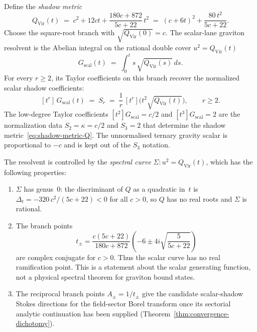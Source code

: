\begin{theorem}
\label{thm:graviton-resolvent-closed}%
%
%
Define the \emph{shadow metric}
\begin{equation}\label{eq:shadow-metric-Q}
Q_{\mathrm{Vir}}(t)
\;=\;
c^2 + 12ct + \frac{180c + 872}{5c + 22}\,t^2
\;=\;
(c + 6t)^2 + \frac{80\,t^2}{5c + 22}.
\end{equation}
Choose the square-root branch with
\(\sqrt{Q_{\mathrm{Vir}}(0)}=c\). The scalar-lane graviton
resolvent is the Abelian integral on the rational double cover
\(u^2=Q_{\mathrm{Vir}}(t)\)
\begin{equation}\label{eq:graviton-resolvent-closed}
G_{\mathrm{scal}}(t)
\;=\;
\int_0^t s\,\sqrt{Q_{\mathrm{Vir}}(s)}\,ds.
\end{equation}
For every \(r\ge2\), its Taylor coefficients on this branch recover
the normalized scalar shadow coefficients:
\begin{equation}\label{eq:resolvent-shadow-extraction}
[t^r]\,G_{\mathrm{scal}}(t)
\;=\;
S_r
\;=\;
\frac{1}{r}\,[t^r]\bigl(t^2\sqrt{Q_{\mathrm{Vir}}(t)}\bigr),
\qquad r \ge 2.
\end{equation}
The low-degree Taylor coefficients
$[t^2]G_{\mathrm{scal}} = c/2$ and
$[t^3]G_{\mathrm{scal}} = 2$ are the normalization data
$S_2 = \kappa = c/2$ and $S_3=2$ that determine
the shadow metric~\eqref{eq:shadow-metric-Q}. The unnormalised ternary
gravity scalar is proportional to $-c$ and is kept out of the $S_3$
notation.

The resolvent is controlled by the \emph{spectral curve}
$\Sigma \colon u^2 = Q_{\mathrm{Vir}}(t)$, which has the
following properties:
\begin{enumerate}[label=\textup{(\roman*)}]
\item $\Sigma$ has genus~$0$: the discriminant of $Q$ as a
 quadratic in~$t$ is
 $\Delta_t = -320\,c^2/(5c+22) < 0$ for all $c > 0$,
 so $Q$ has no real roots and $\Sigma$ is rational.
\item The branch points
 \[
 t_\pm =
 \frac{c(5c+22)}{180c+872}
 \left(-6 \pm 4i\sqrt{\frac{5}{5c+22}}\right)
 \]
 are complex conjugate for $c > 0$. Thus the scalar curve has no
 real ramification point. This is a statement about the scalar
 generating function, not a physical spectral theorem for graviton
 bound states.
\item The reciprocal branch points \(A_\pm = 1/t_\pm\) give the
 candidate scalar-shadow Stokes directions for the field-sector Borel transform
 once its sectorial analytic continuation has been supplied
 \textup{(}Theorem~\textup{\ref{thm:convergence-dichotomy}}\textup{)}.
\end{enumerate}
\end{theorem}

